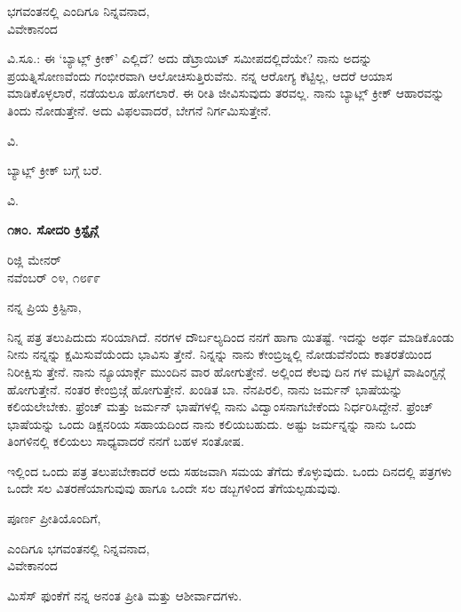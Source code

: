 \begin{flushright}
ಭಗವಂತನಲ್ಲಿ ಎಂದಿಗೂ ನಿನ್ನವನಾದ,\\ವಿವೇಕಾನಂದ
\end{flushright}

ವಿ.ಸೂ.: ಈ ‘ಬ್ಯಾಟ್ಲ್ ಕ್ರೀಕ್’ ಎಲ್ಲಿದೆ? ಅದು ಡೆಟ್ರಾಯಿಟ್ ಸಮೀಪದಲ್ಲಿದೆಯೇ? ನಾನು ಅದನ್ನು ಪ್ರಯತ್ನಿಸೋಣವೆಂದು ಗಂಭೀರವಾಗಿ ಆಲೋಚಿಸುತ್ತಿರುವೆನು. ನನ್ನ ಆರೋಗ್ಯ ಕೆಟ್ಟಿಲ್ಲ, ಆದರೆ ಆಯಾಸ ಮಾಡಿಕೊಳ್ಳಲಾರೆ, ನಡೆಯಲೂ ಹೋಗಲಾರೆ. ಈ ರೀತಿ ಜೀವಿಸುವುದು ತರವಲ್ಲ. ನಾನು ಬ್ಯಾಟ್ಲ್ ಕ್ರೀಕ್ ಆಹಾರವನ್ನು ತಿಂದು ನೋಡುತ್ತೇನೆ. ಅದು ವಿಫಲವಾದರೆ, ಬೇಗನೆ ನಿರ್ಗಮಿಸುತ್ತೇನೆ.

\begin{flushright}
ವಿ.
\end{flushright}

ಬ್ಯಾಟ್ಲ್ ಕ್ರೀಕ್ ಬಗ್ಗೆ ಬರೆ.

\begin{flushright}
ವಿ.
\end{flushright}

\begin{center}
\textbf{೧೫೦. ಸೋದರಿ ಕ್ರಿಸ್ಟೈನ್ಗೆ}
\end{center}

\begin{flushright}
ರಿಜ್ಲಿ ಮೇನರ್\\ನವೆಂಬರ್ ೦೪, ೧೮೯೯
\end{flushright}

ನನ್ನ ಪ್ರಿಯ ಕ್ರಿಸ್ಟಿನಾ,

ನಿನ್ನ ಪತ್ರ ತಲುಪಿದುದು ಸರಿಯಾಗಿದೆ. ನರಗಳ ದೌರ್ಬಲ್ಯದಿಂದ ನನಗೆ ಹಾಗಾ ಯಿತಷ್ಟೆ. ಇದನ್ನು ಅರ್ಥ ಮಾಡಿಕೊಂಡು ನೀನು ನನ್ನನ್ನು ಕ್ಷಮಿಸುವೆಯೆಂದು ಭಾವಿಸು ತ್ತೇನೆ. ನಿನ್ನನ್ನು ನಾನು ಕೇಂಬ್ರಿಜ್ನಲ್ಲಿ ನೋಡುವೆನೆಂದು ಕಾತರತೆಯಿಂದ ನಿರೀಕ್ಷಿಸು ತ್ತೇನೆ. ನಾನು ನ್ಯೂಯಾರ್ಕ್ಗೆ ಮುಂದಿನ ವಾರ ಹೋಗುತ್ತೇನೆ. ಅಲ್ಲಿಂದ ಕೆಲವು ದಿನ ಗಳ ಮಟ್ಟಿಗೆ ವಾಷಿಂಗ್ಟನ್ಗೆ ಹೋಗುತ್ತೇನೆ. ನಂತರ ಕೇಂಬ್ರಿಜ್ಗೆ ಹೋಗುತ್ತೇನೆ. ಖಂಡಿತ ಬಾ. ನೆನಪಿರಲಿ, ನಾನು ಜರ್ಮನ್ ಭಾಷೆಯನ್ನು ಕಲಿಯಲೇಬೇಕು. ಫ್ರೆಂಚ್ ಮತ್ತು ಜರ್ಮನ್ ಭಾಷೆಗಳಲ್ಲಿ ನಾನು ವಿದ್ವಾಂಸನಾಗಬೇಕೆಂದು ನಿರ್ಧರಿಸಿದ್ದೇನೆ. ಫ್ರೆಂಚ್ ಭಾಷೆಯನ್ನು ಒಂದು ಡಿಕ್ಷನರಿಯ ಸಹಾಯದಿಂದ ನಾನು ಕಲಿಯಬಹುದು. ಅಷ್ಟು ಜರ್ಮನ್ನನ್ನು ನಾನು ಒಂದು ತಿಂಗಳಿನಲ್ಲಿ ಕಲಿಯಲು ಸಾಧ್ಯವಾದರೆ ನನಗೆ ಬಹಳ ಸಂತೋಷ.

ಇಲ್ಲಿಂದ ಒಂದು ಪತ್ರ ತಲುಪಬೇಕಾದರೆ ಅದು ಸಹಜವಾಗಿ ಸಮಯ ತೆಗೆದು ಕೊಳ್ಳುವುದು. ಒಂದು ದಿನದಲ್ಲಿ ಪತ್ರಗಳು ಒಂದೇ ಸಲ ವಿತರಣೆಯಾಗುವುವು ಹಾಗೂ ಒಂದೇ ಸಲ ಡಬ್ಬಗಳಿಂದ ತೆಗೆಯಲ್ಪಡುವುವು.

ಪೂರ್ಣ ಪ್ರೀತಿಯೊಂದಿಗೆ,

\begin{flushright}
ಎಂದಿಗೂ ಭಗವಂತನಲ್ಲಿ ನಿನ್ನವನಾದ,\\ವಿವೇಕಾನಂದ
\end{flushright}

ಮಿಸೆಸ್ ಫುಂಕೆಗೆ ನನ್ನ ಅನಂತ ಪ್ರೀತಿ ಮತ್ತು ಆಶೀರ್ವಾದಗಳು.

